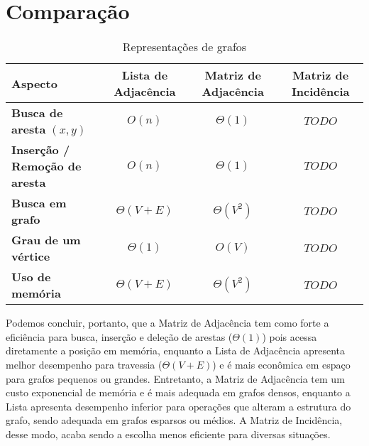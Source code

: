\section{Comparação}
\begin{table}[H]
\centering
\caption{Representações de grafos}
\begin{tabular}{|l|c|c|c|}
\hline
\textbf{Aspecto} & \textbf{Lista de Adjacência} & \textbf{Matriz de Adjacência} & \textbf{Matriz de Incidência} \\ \hline
\textbf{Busca de aresta} $(x, y)$ & $O(n)$ & $\Theta(1)$ & $TODO$ \\ \hline
\textbf{Inserção / Remoção de aresta} & $O(n)$ & $\Theta(1)$ & $TODO$ \\ \hline
\textbf{Busca em grafo} & $\Theta(V + E)$ & $\Theta(V^2)$ & $TODO$ \\ \hline
\textbf{Grau de um vértice} & $\Theta(1)$ & $O(V)$ & $TODO$ \\ \hline
\textbf{Uso de memória} & $\Theta(V + E)$ & $\Theta(V^2)$ & $TODO$ \\ \hline
\end{tabular}
\vspace{0.3em}
\end{table}

Podemos concluir, portanto, que a Matriz de Adjacência tem como forte a eficiência para busca, inserção e deleção de arestas ($\Theta(1)$) pois acessa diretamente a posição em memória, 
enquanto a Lista de Adjacência apresenta melhor desempenho para travessia ($\Theta(V+E)$) e é mais econômica em espaço para grafos pequenos ou grandes.
Entretanto, a Matriz de Adjacência tem um custo exponencial de memória e é mais adequada em grafos densos, 
enquanto a Lista apresenta desempenho inferior para operações que alteram a estrutura do grafo, sendo adequada em grafos esparsos ou médios. 
A Matriz de Incidência, desse modo, acaba sendo a escolha menos eficiente para diversas situações.


